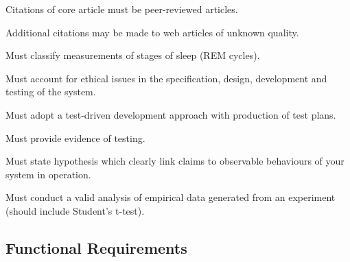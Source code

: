 \begin{reqtable}
  {Citations of core article must be peer-reviewed articles.}
  \phigh
  \deps{\ref{req:4-articles}}
  \sspec

  {Additional citations may be made to web articles of unknown quality.}
  \plow
  \dnone
  \sspec

  {Must classify measurements of stages of sleep (REM cycles).}
  \phigh
  \dnone


  \reqheader

  {Must account for ethical issues in the specification, design, development and testing of the
    system.}
  \phigh
  \dnone
  \sspec


  \reqheader

  {Must adopt a test-driven development approach with production of test plans.}
  \phigh
  \dnone
  \sspec

  {Must provide evidence of testing.}
  \phigh
  \dnone
  \sspec

  {Must state hypothesis which clearly link claims to observable behaviours of your system in
    operation.}
  \phigh
  \dnone
  \sspec

  {Must conduct a valid analysis of empirical data generated from an experiment (should include
    Student's t-test).}
  \phigh
  \dnone
  \sspec
\end{reqtable}

\subsection{Functional Requirements}\label{ssec:functional-requirements}

